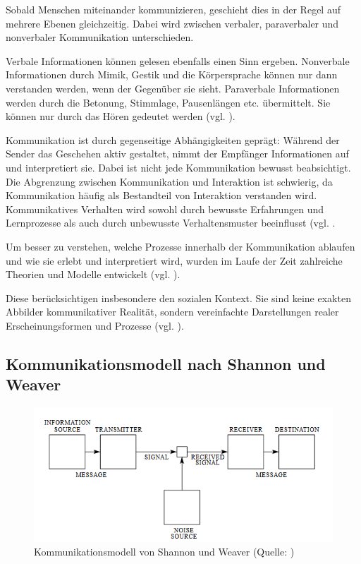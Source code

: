 Sobald Menschen miteinander kommunizieren, geschieht dies in der Regel auf mehrere Ebenen gleichzeitig. Dabei wird zwischen verbaler, paraverbaler und nonverbaler Kommunikation unterschieden. 

Verbale Informationen können gelesen ebenfalls einen Sinn ergeben.
Nonverbale Informationen durch Mimik, Gestik und die Körpersprache können nur dann verstanden werden, wenn der Gegenüber sie sieht. 
Paraverbale Informationen werden durch die Betonung, Stimmlage, Pausenlängen etc. übermittelt. Sie können nur durch das Hören gedeutet werden (vgl. \citealp[S. 33]{ebert_formen_2018}).

Kommunikation ist durch gegenseitige Abhängigkeiten geprägt: Während der Sender das Geschehen aktiv gestaltet, nimmt der Empfänger Informationen auf und interpretiert sie. Dabei ist nicht jede Kommunikation bewusst beabsichtigt. Die Abgrenzung zwischen Kommunikation und Interaktion ist schwierig, da Kommunikation häufig als Bestandteil von Interaktion verstanden wird. Kommunikatives Verhalten wird sowohl durch bewusste Erfahrungen und Lernprozesse als auch durch unbewusste Verhaltensmuster beeinflusst (vgl. \citealp[S. 20]{becker_praxishandbuch_2018}.

Um besser zu verstehen, welche Prozesse innerhalb der Kommunikation ablaufen und wie sie erlebt und interpretiert wird, wurden im Laufe der Zeit zahlreiche Theorien und Modelle entwickelt (vgl. \citealp[S. 311]{schwarz_grundlagen_2019}).

Diese  berücksichtigen insbesondere den sozialen Kontext. Sie sind keine exakten Abbilder kommunikativer Realität, sondern vereinfachte Darstellungen realer Erscheinungsformen und Prozesse (vgl. \citealp[S. 56]{maletzke_kommunikationswissenschaft_1998}).

\subsection{Kommunikationsmodell nach Shannon und Weaver}

\begin{figure}[ht]
\centering
\includegraphics[width=1\linewidth]{content/pictures/shannon-weaver.PNG}
\caption{Kommunikationsmodell von Shannon und Weaver (Quelle: \citealp[S. 2]{shannon_mathematical_1948})}
\label{fig:shannon-weaver-modell}
\end{figure}

